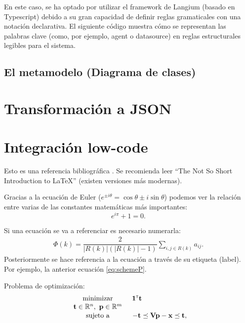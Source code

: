 \documentclass[12pt,twoside,titlepage]{report}
\newcommand{\transpuesta}{\mbox{\tiny $\mathsf{T}$}}
\begin{document}
En este caso, se ha optado por utilizar el framework de Langium (basado en Typescript) debido a su gran capacidad de definir reglas gramaticales con una notación declarativa. El siguiente código muestra cómo se representan las palabras clave (como, por ejemplo, agent o datasource) en reglas estructurales legibles para el sistema.

\subsection{El metamodelo (Diagrama de clases)}


\section{Transformación a JSON}


\section{Integración low-code}


Esto es una referencia bibliográfica \cite{bibex}. Se recomienda leer ``The Not So Short Introduction to \LaTeX'' \cite{Oetiker2007} (existen versiones más modernas).


Gracias a la ecuación de Euler ($e^{ \pm i\theta } = \cos \theta \pm i\sin \theta$) podemos ver la relación entre varias de las constantes matemáticas más importantes:
\[
    e^{i\pi} + 1 = 0.
\]


Si una ecuación se va a referenciar es necesario numerarla:
\begin{eqnarray}
\label{eq:schemeP}
 \Phi (k)=\dfrac{2}{|R(k)|(|R(k)|-1)} \underset{i,j \in R(k)}{\sum} a_{ij}.
\end{eqnarray}
Posteriormente se hace referencia a la ecuación a través de su etiqueta (label). Por ejemplo, la anterior ecuación \eqref{eq:schemeP}.


Problema de optimización:
\begin{equation}\label{eq:LP1}
\begin{array}{cl}
  \displaystyle \begin{array}{c}\mathrm{minimizar} \\ \mathbf{t} \in \mathbb{R}^{n}, \  \mathbf{p} \in \mathbb{R}^{m} \end{array} & \hspace{-0.2cm} \begin{array}{c} \mathbf{1}^{\transpuesta}\mathbf{t} \\ \mbox{} \end{array}  \\
  & \vspace{-0.4cm} \\ %
  \mbox{sujeto a} & -\mathbf{t} \preceq  \mathbf{V}\mathbf{p} - \mathbf{x}  \preceq  \mathbf{t},\\
 \end{array}
\end{equation}
\end{document}
